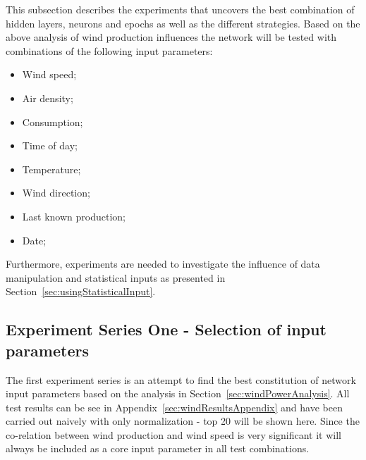 This subsection describes the experiments that uncovers the best combination of hidden layers, neurons and epochs as well as the different strategies. Based on the above analysis of wind production influences the network will be tested with combinations of the following input parameters:

\begin{itemize}
\item Wind speed;
\item Air density;
\item Consumption;
\item Time of day;
\item Temperature;
\item Wind direction;
\item Last known production;
\item Date;
\end{itemize}

Furthermore, experiments are needed to investigate the influence of data manipulation and statistical inputs as presented in Section~\ref{sec:usingStatisticalInput}. 


\subsection{Experiment Series One - Selection of input parameters}
The first experiment series is an attempt to find the best constitution of network input parameters based on the analysis in Section~\ref{sec:windPowerAnalysis}. All test results can be see in Appendix~\ref{sec:windResultsAppendix} and have been carried out naively with only normalization - top 20 will be shown here. Since the co-relation between wind production and wind speed is very significant it will always be included as a core input parameter in all test combinations.

